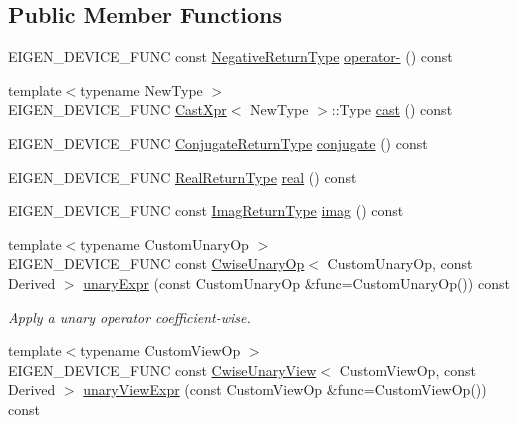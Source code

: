 \subsection*{Public Member Functions}
\begin{DoxyCompactItemize}
\item 
E\+I\+G\+E\+N\+\_\+\+D\+E\+V\+I\+C\+E\+\_\+\+F\+U\+NC const \mbox{\hyperlink{class_eigen_1_1_cwise_unary_op}{Negative\+Return\+Type}} \mbox{\hyperlink{class_eigen_1_1_array_base_ae04203c232cffc00218bb9cd71396ed6}{operator-\/}} () const
\item 
{\footnotesize template$<$typename New\+Type $>$ }\\E\+I\+G\+E\+N\+\_\+\+D\+E\+V\+I\+C\+E\+\_\+\+F\+U\+NC \mbox{\hyperlink{struct_eigen_1_1_array_base_1_1_cast_xpr}{Cast\+Xpr}}$<$ New\+Type $>$\+::Type \mbox{\hyperlink{class_eigen_1_1_array_base_adbbb2eb5bd61e6a5515ae511423d937a}{cast}} () const
\item 
E\+I\+G\+E\+N\+\_\+\+D\+E\+V\+I\+C\+E\+\_\+\+F\+U\+NC \mbox{\hyperlink{struct_eigen_1_1internal_1_1true__type}{Conjugate\+Return\+Type}} \mbox{\hyperlink{class_eigen_1_1_array_base_a06602058e7d80827b7b0ec7cb72a747a}{conjugate}} () const
\item 
E\+I\+G\+E\+N\+\_\+\+D\+E\+V\+I\+C\+E\+\_\+\+F\+U\+NC \mbox{\hyperlink{struct_eigen_1_1internal_1_1true__type}{Real\+Return\+Type}} \mbox{\hyperlink{class_eigen_1_1_array_base_a3c09942b87b89c06dc204fe8cf514ade}{real}} () const
\item 
E\+I\+G\+E\+N\+\_\+\+D\+E\+V\+I\+C\+E\+\_\+\+F\+U\+NC const \mbox{\hyperlink{class_eigen_1_1_cwise_unary_op}{Imag\+Return\+Type}} \mbox{\hyperlink{class_eigen_1_1_array_base_ac0e2019654b0bf1e82ada75b3ea9e5ef}{imag}} () const
\item 
{\footnotesize template$<$typename Custom\+Unary\+Op $>$ }\\E\+I\+G\+E\+N\+\_\+\+D\+E\+V\+I\+C\+E\+\_\+\+F\+U\+NC const \mbox{\hyperlink{class_eigen_1_1_cwise_unary_op}{Cwise\+Unary\+Op}}$<$ Custom\+Unary\+Op, const Derived $>$ \mbox{\hyperlink{class_eigen_1_1_array_base_a3a548f8d340cd6eeb6aed77409725d88}{unary\+Expr}} (const Custom\+Unary\+Op \&func=Custom\+Unary\+Op()) const
\begin{DoxyCompactList}\small\item\em Apply a unary operator coefficient-\/wise. \end{DoxyCompactList}\item 
{\footnotesize template$<$typename Custom\+View\+Op $>$ }\\E\+I\+G\+E\+N\+\_\+\+D\+E\+V\+I\+C\+E\+\_\+\+F\+U\+NC const \mbox{\hyperlink{class_eigen_1_1_cwise_unary_view}{Cwise\+Unary\+View}}$<$ Custom\+View\+Op, const Derived $>$ \mbox{\hyperlink{class_eigen_1_1_array_base_a68569078c16642154d7c3b3b9a4f5423}{unary\+View\+Expr}} (const Custom\+View\+Op \&func=Custom\+View\+Op()) const

\end{DoxyCompactItemize}
